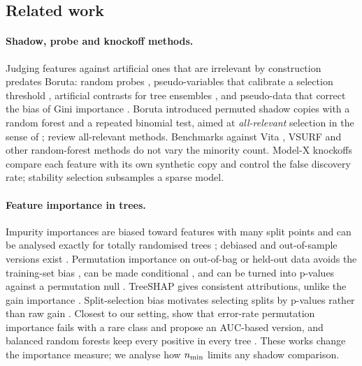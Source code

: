 \subsection{Related work}\label{sec:related}

\paragraph{Shadow, probe and knockoff methods.} Judging features against artificial ones that are irrelevant by construction predates Boruta: random probes \citep{stoppiglia2003ranking}, pseudo-variables that calibrate a selection threshold \citep{wu2007controlling}, artificial contrasts for tree ensembles \citep{tuv2009feature}, and pseudo-data that correct the bias of Gini importance \citep{sandri2008bias}. Boruta \citep{kursa2010boruta,kursa2011all} introduced permuted shadow copies with a random forest and a repeated binomial test, aimed at \emph{all-relevant} selection in the sense of \citet{nilsson2007consistent}; \citet{rudnicki2015all} review all-relevant methods. Benchmarks against Vita \citep{janitza2018computationally}, VSURF \citep{genuer2010variable} and other random-forest methods \citep{hapfelmeier2013new,kursa2014robustness,degenhardt2019evaluation,speiser2019comparison} do not vary the minority count. Model-X knockoffs \citep{candes2018panning,barber2015controlling} compare each feature with its own synthetic copy and control the false discovery rate; stability selection \citep{meinshausen2010stability,shah2013variable} subsamples a sparse model.

\paragraph{Feature importance in trees.} Impurity importances are biased toward features with many split points \citep{strobl2007bias} and can be analysed exactly for totally randomised trees \citep{louppe2013understanding}; debiased and out-of-sample versions exist \citep{li2019debiased,adler2022feature,zhang2023unbiased,scornet2023trees}. Permutation importance on out-of-bag or held-out data avoids the training-set bias \citep{breiman2001random,strobl2007bias}, can be made conditional \citep{strobl2008conditional}, and can be turned into p-values against a permutation null \citep{altmann2010permutation}. TreeSHAP gives consistent attributions, unlike the gain importance \citep{lundberg2017unified,lundberg2020local}. Split-selection bias motivates selecting splits by p-values rather than raw gain \citep{loh1997split,hothorn2006unbiased,strobl2007unbiased,nembrini2018revival}. Closest to our setting, \citet{janitza2013auc} show that error-rate permutation importance fails with a rare class and propose an AUC-based version, and balanced random forests keep every positive in every tree \citep{chen2004using}. These works change the importance measure; we analyse how $n_{\min}$ limits any shadow comparison.

